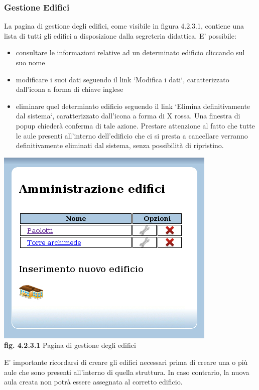 \documentclass[11pt,a4paper]{article}
\begin{document}
\subsubsection{Gestione Edifici}
La pagina di gestione degli edifici, come visibile in figura 4.2.3.1, contiene una lista di tutti gli edifici a disposizione dalla segreteria didattica.
E' possibile:
\begin{itemize}
 \item consultare le informazioni relative ad un determinato edificio cliccando sul suo nome
 \item modificare i suoi dati seguendo il link `Modifica i dati`, caratterizzato dall'icona a forma di chiave inglese
 \item eliminare quel determinato edificio seguendo il link `Elimina definitivamente dal sistema`, caratterizzato dall'icona a forma di X rossa. Una finestra di popup chiederà conferma di tale azione. Prestare attenzione al fatto che tutte le aule presenti all'interno dell'edificio che ci si presta a cancellare verranno definitivamente eliminati dal sistema, senza possibilità di ripristino.
\end{itemize}

\bigskip
\begin{center}
	\includegraphics[scale=0.5]{images/amministrazione_edifici.jpg}\\
	\textbf{fig. 4.2.3.1} Pagina di gestione degli edifici\\
\end{center}
\bigskip

E' importante ricordarsi di creare gli edifici necessari prima di creare una o più aule che sono presenti all'interno di quella struttura. In caso contrario, la nuova aula creata non potrà essere assegnata al corretto edificio.
\end{document}
